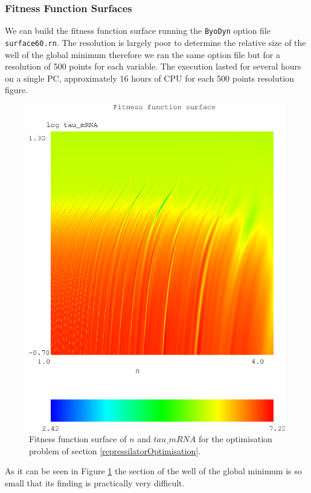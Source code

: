 \documentclass[a4paper, 11pt]{article}
\begin{document}
  \subsubsection{Fitness Function Surfaces}
  We can build the fitness function surface running the \texttt{ByoDyn} option file \texttt{surface60.rn}.
  The resolution is largely poor to determine the relative size of the well of the global minimum therefore we ran the same option file but for a resolution of 500 points for each variable.
  The execution lasted for several hours on a single PC, approximately 16 hours of CPU for each 500 points resolution figure.
  \begin{figure}
    \begin{center}
      \includegraphics[scale=.75]{figures/60repressilator.eps}
      \caption{Fitness function surface of $n$ and $tau\_mRNA$ for the optimisation problem of section \ref{repressilatorOptimisation}.\label{amadori60}}
    \end{center}
  \end{figure}
  As it can be seen in Figure \ref{amadori60} the section of the well of the global minimum is so small that its finding is practically very difficult.
\end{document}
